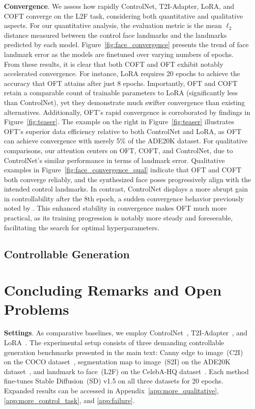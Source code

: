 \textbf{Convergence}. We assess how rapidly ControlNet, T2I-Adapter, LoRA, and COFT converge on the L2F task, considering both quantitative and qualitative aspects. For our quantitative analysis, the evaluation metric is the mean $\ell_2$ distance measured between the control face landmarks and the landmarks predicted by each model. Figure~\ref{fig:face_convergence} presents the trend of face landmark error as the models are finetuned over varying numbers of epochs. From these results, it is clear that both COFT and OFT exhibit notably accelerated convergence. For instance, LoRA requires 20 epochs to achieve the accuracy that OFT attains after just 8 epochs. Importantly, OFT and COFT retain a comparable count of trainable parameters to LoRA (significantly less than ControlNet), yet they demonstrate much swifter convergence than existing alternatives. Additionally, OFT’s rapid convergence is corroborated by findings in Figure~\ref{fig:teaser}. The example on the right in Figure~\ref{fig:teaser} illustrates OFT’s superior data efficiency relative to both ControlNet and LoRA, as OFT can achieve convergence with merely 5\% of the ADE20K dataset. For qualitative comparisons, our attention centers on OFT, COFT, and ControlNet, due to ControlNet's similar performance in terms of landmark error. Qualitative examples in Figure~\ref{fig:face_convergence_qual} indicate that OFT and COFT both converge reliably, and the synthesized face poses progressively align with the intended control landmarks. In contrast, ControlNet displays a more abrupt gain in controllability after the 8th epoch, a sudden convergence behavior previously noted by \cite{zhang2023adding}. This enhanced stability in convergence makes OFT much more practical, as its training progression is notably more steady and foreseeable, facilitating the search for optimal hyperparameters.

\subsection{Controllable Generation}

\section{Concluding Remarks and Open Problems}

\textbf{Settings}. As comparative baselines, we employ ControlNet~\cite{zhang2023adding}, T2I-Adapter~\cite{mou2023t2i}, and LoRA~\cite{hulora2022}. The experimental setup consists of three demanding controllable generation benchmarks presented in the main text: Canny edge to image~(C2I) on the COCO dataset~\cite{lin2014microsoft}, segmentation map to image~(S2I) on the ADE20K dataset~\cite{zhou2017scene}, and landmark to face~(L2F) on the CelebA-HQ dataset~\cite{karras2018progressive,xia2021tedigan}. Each method fine-tunes Stable Diffusion~(SD) v1.5 on all three datasets for 20 epochs. Expanded results can be accessed in Appendix~\ref{app:more_qualitative}, \ref{app:more_control_task}, and \ref{app:failure}.

